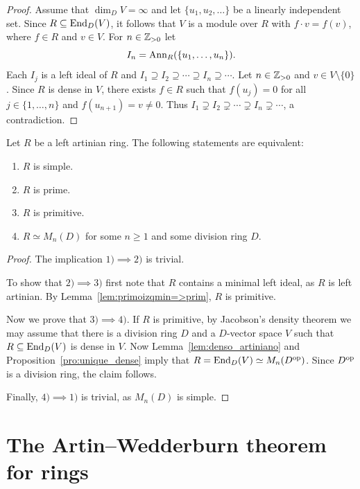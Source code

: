 \begin{proof}
	Assume that $\dim_DV=\infty$ and let $\{u_1,u_2,\dots\}$ be a linearly independent set. 
	Since $R\subseteq\operatorname{End}_D(V)$, it follows that 
	$V$ is a module over $R$ with $f\cdot v=f(v)$, where $f\in R$ and $v\in V$. 
	For $n\in\mathbb{Z}_{>0}$ let 
	\[
		I_n=\operatorname{Ann}_R(\{u_1,\dots,u_n\}).
	\]
	Each $I_j$ is a left ideal of $R$ and $I_1\supseteq
	I_2\supseteq\cdots\supseteq I_n\supseteq\cdots$. Let 
	$n\in\mathbb{Z}_{>0}$ and $v\in V\setminus\{0\}$. Since $R$ is dense
	in $V$, there exists $f\in R$ such that $f(u_j)=0$ for all $j\in\{1,\dots,n\}$ and 
	$f(u_{n+1})=v\ne0$. Thus $I_1\supsetneq I_2\supsetneq\cdots\supsetneq
	I_n\supsetneq\cdots$, a contradiction.
\end{proof}

\begin{theorem}[Wedderburn]
    \label{thm:Wedderburn4rings}
	Let $R$ be a left artinian ring. The following statements are equivalent:
	\begin{enumerate}
		\item $R$ is simple.
		\item $R$ is prime.
		\item $R$ is primitive.
		\item $R\simeq M_n(D)$ for some $n\geq1$ and some division ring $D$.
	\end{enumerate}
\end{theorem}

\begin{proof}
	The implication $1)\implies2)$ is trivial. 
	
	To show that $2)\implies3)$ first note that 
	$R$ contains a minimal left ideal, as $R$ is left artinian. 
	By Lemma~\ref{lem:primoizqmin=>prim}, $R$ is primitive. 

	Now we prove that $3)\implies4)$. If $R$ is primitive, by 
	Jacobson's density theorem we may assume that there is a division ring $D$ and a $D$-vector space $V$ such that 
    $R\subseteq\operatorname{End}_D(V)$ is dense in $V$. 
	Now Lemma~\ref{lem:denso_artiniano} and Proposition~\ref{pro:unique_dense} 
    imply that $R=\operatorname{End}_D(V)\simeq M_n(D^{\operatorname{op}})$. Since 
	$D^{\operatorname{op}}$ is a division ring, the claim follows. 

	Finally, $4)\implies1)$ is trivial, as $M_n(D)$ is simple. 
\end{proof}

\section{The Artin--Wedderburn theorem for rings}
\lecture


